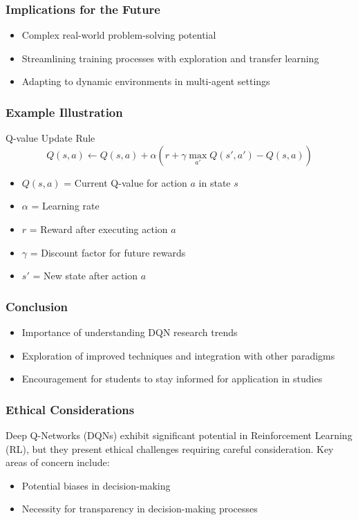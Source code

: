 \documentclass[aspectratio=169]{beamer}
\begin{document}
\begin{frame}[fragile]
    \frametitle{Implications for the Future}
    \begin{itemize}
        \item Complex real-world problem-solving potential
        \item Streamlining training processes with exploration and transfer learning
        \item Adapting to dynamic environments in multi-agent settings
    \end{itemize}
\end{frame}

\begin{frame}[fragile]
    \frametitle{Example Illustration}
    \begin{block}{Q-value Update Rule}
    \[
    Q(s, a) \leftarrow Q(s, a) + \alpha \left( r + \gamma \max_{a'} Q(s', a') - Q(s, a) \right)
    \]
    \begin{itemize}
        \item $Q(s, a)$ = Current Q-value for action $a$ in state $s$
        \item $\alpha$ = Learning rate
        \item $r$ = Reward after executing action $a$
        \item $\gamma$ = Discount factor for future rewards
        \item $s'$ = New state after action $a$
    \end{itemize}
    \end{block}
\end{frame}

\begin{frame}[fragile]
    \frametitle{Conclusion}
    \begin{itemize}
        \item Importance of understanding DQN research trends
        \item Exploration of improved techniques and integration with other paradigms
        \item Encouragement for students to stay informed for application in studies
    \end{itemize}
\end{frame}

\begin{frame}[fragile]
    \frametitle{Ethical Considerations}
    Deep Q-Networks (DQNs) exhibit significant potential in Reinforcement Learning (RL), but they present ethical challenges requiring careful consideration. Key areas of concern include:
    \begin{itemize}
        \item Potential biases in decision-making
        \item Necessity for transparency in decision-making processes
    \end{itemize}
\end{frame}
\end{document}
